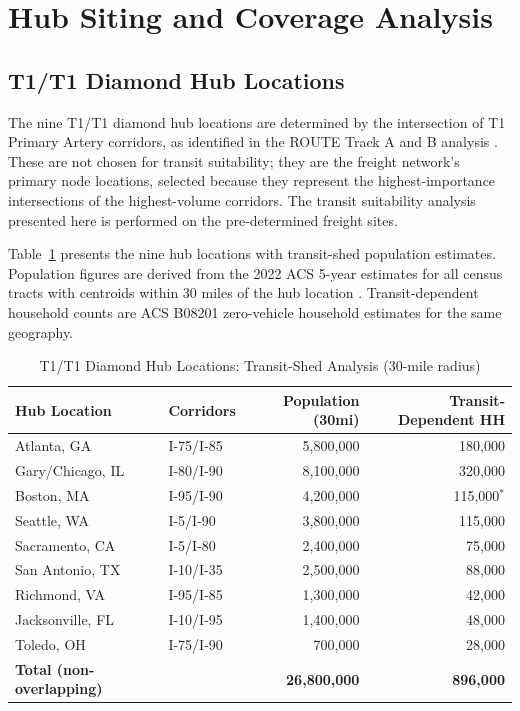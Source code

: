 \section{Hub Siting and Coverage Analysis}

\subsection{T1/T1 Diamond Hub Locations}

The nine T1/T1 diamond hub locations are determined by the intersection of T1 Primary Artery corridors, as identified in the ROUTE Track A and B analysis \citep{ROUTE_A1,ROUTE_B4}. These are not chosen for transit suitability; they are the freight network's primary node locations, selected because they represent the highest-importance intersections of the highest-volume corridors. The transit suitability analysis presented here is performed on the pre-determined freight sites.

Table~\ref{tab:hubs} presents the nine hub locations with transit-shed population estimates. Population figures are derived from the 2022 ACS 5-year estimates for all census tracts with centroids within 30 miles of the hub location \citep{ACS_B08201_2022}. Transit-dependent household counts are ACS B08201 zero-vehicle household estimates for the same geography.

\begin{table}[h]
\centering
\caption{T1/T1 Diamond Hub Locations: Transit-Shed Analysis (30-mile radius)}
\label{tab:hubs}
\begin{tabular}{llrr}
\toprule
Hub Location & Corridors & Population (30mi) & Transit-Dependent HH \\
\midrule
Atlanta, GA & I-75/I-85 & 5,800,000 & 180,000 \\
Gary/Chicago, IL & I-80/I-90 & 8,100,000 & 320,000 \\
Boston, MA & I-95/I-90 & 4,200,000 & 115,000$^*$ \\
Seattle, WA & I-5/I-90 & 3,800,000 & 115,000 \\
Sacramento, CA & I-5/I-80 & 2,400,000 & 75,000 \\
San Antonio, TX & I-10/I-35 & 2,500,000 & 88,000 \\
Richmond, VA & I-95/I-85 & 1,300,000 & 42,000 \\
Jacksonville, FL & I-10/I-95 & 1,400,000 & 48,000 \\
Toledo, OH & I-75/I-90 & 700,000 & 28,000 \\
\midrule
\textbf{Total (non-overlapping)} & & \textbf{26,800,000} & \textbf{896,000} \\
\bottomrule
\end{tabular}
\end{table}

